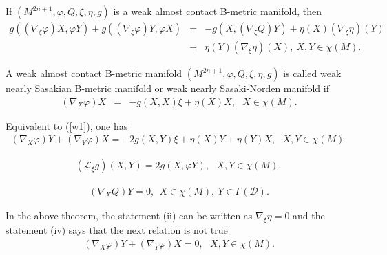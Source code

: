 \documentclass[10pt,a4paper]{amsart}
\begin{document}
\begin{lemma}
If $(M^{2n+1},\varphi,Q,\xi,\eta, g)$ is a weak almost contact B-metric manifold, then	
\begin{eqnarray}
	g((\nabla_{\xi}\varphi)X,\varphi Y)+g((\nabla_{\xi}\varphi)Y,\varphi X)&=&-g(X,(\nabla_{\xi}Q)Y)+\eta(X)(\nabla_{\xi}\eta)(Y) \nonumber\\
	&+&\eta(Y)(\nabla_{\xi}\eta)(X), \ X,Y\in\chi(M). \label{w9}
\end{eqnarray}
\end{lemma}

\begin{definition}
A weak almost contact B-metric manifold $(M^{2n+1},\varphi,Q,\xi,\eta, g)$ is called weak nearly Sasakian B-metric manifold or weak nearly Sasaki-Norden manifold if
\begin{eqnarray}
	(\nabla_X\varphi)X&=&-g(X,X)\xi+\eta(X)X, \ \ \ X\in\chi(M).  \label{w1}
\end{eqnarray}
\end{definition}

\begin{remark}
Equivalent to (\ref{w1}), one has 	
\begin{eqnarray}
	(\nabla_X\varphi)Y+(\nabla_Y\varphi)X=-2g(X,Y)\xi+\eta(X)Y+\eta(Y)X, \ \ \ X,Y\in\chi(M).  \label{w2}
\end{eqnarray}	
\end{remark}

\begin{eqnarray}
	(\mathcal{L}_{\xi}g)(X,Y)=2g(X,\varphi Y), \ \ \ X,Y\in\chi(M),   \label{w5}
\end{eqnarray} 

\begin{eqnarray}
	(\nabla_XQ)Y=0, \ \  X\in\chi(M), \ Y\in\Gamma(\mathcal{D}). \label{w7}
\end{eqnarray} 

\begin{remark}
	In the above theorem, the statement (ii) can be written as  $\nabla_{\xi}\eta=0$ and the statement (iv) says that  the next relation is not true
	\begin{eqnarray}
		(\nabla_X\varphi)Y+(\nabla_Y\varphi)X=0, \ \ \ X,Y\in\chi(M). \label{w4}
	\end{eqnarray}
\end{remark}
\end{document}
